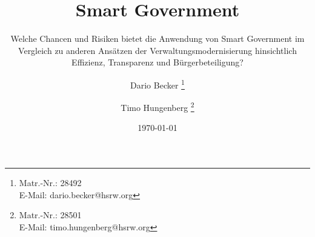 \titlehead{
{\Large Hochschule Rhein Waal}\\
Fakultät für Kommunikation und Umwelt\\
Friedrich-Heinrich-Allee 25\\
47475 Kamp-Lintfort
}

\subject{
Abschlussbericht\\
\normalfont
im Modul New Public Management\\
}

\title{Smart Government}

\subtitle{Welche Chancen und Risiken bietet die Anwendung von Smart Government im Vergleich zu anderen Ansätzen der Verwaltungsmodernisierung hinsichtlich Effizienz, Transparenz und Bürgerbeteiligung?}
\author{
Dario Becker
\thanks{
 Matr.-Nr.: 28492\\
E-Mail: dario.becker@hsrw.org}
\and Timo Hungenberg
\thanks{
Matr.-Nr.: 28501\\
E-Mail: timo.hungenberg@hsrw.org}
}

\date{\today}


\maketitle
